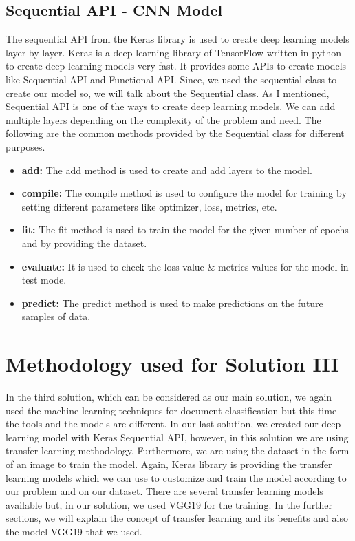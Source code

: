 \subsection{Sequential API - CNN Model}
The sequential API from the Keras library is used to create deep learning models layer by layer. Keras is a deep learning library of TensorFlow written in python to create deep learning models very fast. It provides some APIs to create models like Sequential API and Functional API. Since, we used the sequential class to create our model so, we will talk about the Sequential class. As I mentioned, Sequential API is one of the ways to create deep learning models. We can add multiple layers depending on the complexity of the problem and need. The following are the common methods provided by the Sequential class for different purposes.
\newline
\begin{itemize}
  \item \textbf{add:} The add method is used to create and add layers to the model.
  \item \textbf{compile:} The compile method is used to configure the model for training by setting different parameters like optimizer, loss, metrics, etc.
  \item \textbf{fit:} The fit method is used to train the model for the given number of epochs and by providing the dataset.
  \item \textbf{evaluate:} It is used to check the loss value \& metrics values for the model in test mode.
  \item \textbf{predict:} The predict method is used to make predictions on the future samples of data.
\end{itemize}
\section{Methodology used for Solution III}
In the third solution, which can be considered as our main solution, we again used the machine learning techniques for document classification but this time the tools and the models are different. In our last solution, we created our deep learning model with Keras Sequential API, however, in this solution we are using transfer learning methodology. Furthermore, we are using the dataset in the form of an image to train the model. Again, Keras library is providing the transfer learning models which we can use to customize and train the model according to our problem and on our dataset. There are several transfer learning models available but, in our solution, we used VGG19 \cite{vgg_19} for the training. In the further sections, we will explain the concept of transfer learning and its benefits and also the model VGG19 that we used.
